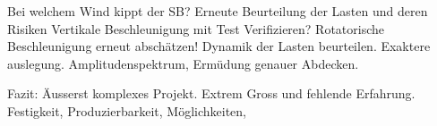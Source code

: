 Bei welchem Wind kippt der SB?
Erneute Beurteilung der Lasten und deren Risiken
Vertikale Beschleunigung mit Test Verifizieren?
Rotatorische Beschleunigung erneut abschätzen!
Dynamik der Lasten beurteilen. Exaktere auslegung. Amplitudenspektrum, Ermüdung genauer Abdecken.

Fazit: Äusserst komplexes Projekt. Extrem Gross und fehlende Erfahrung. Festigkeit, Produzierbarkeit, Möglichkeiten, 
